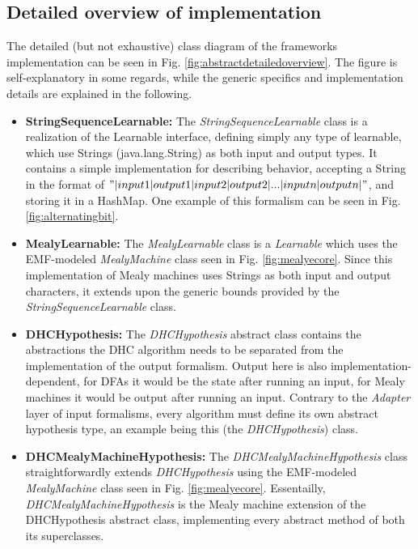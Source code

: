 \subsection{Detailed overview of implementation} \label{item:stringsequencelearnable}

The detailed (but not exhaustive) class diagram of the frameworks implementation can be seen in Fig. \ref{fig:abstractdetailedoverview}. The figure is self-explanatory in some regards, while the generic specifics and implementation details are explained in the following.

\begin{itemize}
	\item \textbf{StringSequenceLearnable:} The \emph{StringSequenceLearnable} class is a realization of the Learnable interface, defining simply any type of learnable, which use Strings (java.lang.String) as both input and output types. It contains a simple implementation for describing behavior, accepting a String in the format of $"|input1|output1|input2|output2|...|inputn|outputn|"$, and storing it in a HashMap. One example of this formalism can be seen in Fig. \ref{fig:alternatingbit}.
	
	\item \textbf{MealyLearnable:} The \emph{MealyLearnable} class is a \emph{Learnable} which uses the EMF-modeled \emph{MealyMachine} class seen in Fig. \ref{fig:mealyecore}. Since this implementation of Mealy machines uses Strings as both input and output characters, it extends upon the generic bounds provided by the \emph{StringSequenceLearnable} class.
	
	\item \textbf{DHCHypothesis:} The \emph{DHCHypothesis} abstract class contains the abstractions the DHC algorithm needs to be separated from the implementation of the output formalism. Output here is also implementation-dependent, for DFAs it would be the state after running an input, for Mealy machines it would be output after running an input. Contrary to the \emph{Adapter} layer of input formalisms, every algorithm must define its own abstract hypothesis type, an example being this (the \emph{DHCHypothesis}) class.
	
	\item \textbf{DHCMealyMachineHypothesis:} The \emph{DHCMealyMachineHypothesis} class straightforwardly extends \emph{DHCHypothesis} using the EMF-modeled \emph{MealyMachine} class seen in Fig. \ref{fig:mealyecore}. Essentailly, \emph{DHCMealyMachineHypothesis} is the Mealy machine extension of the DHCHypothesis abstract class, implementing every abstract method of both its superclasses.
	

\end{itemize}
